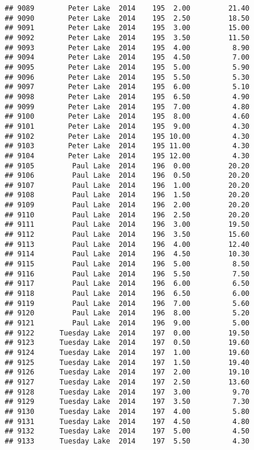 \documentclass[
]{article}
\begin{document}
\begin{verbatim}
## 9089        Peter Lake  2014    195  2.00         21.40
## 9090        Peter Lake  2014    195  2.50         18.50
## 9091        Peter Lake  2014    195  3.00         15.00
## 9092        Peter Lake  2014    195  3.50         11.50
## 9093        Peter Lake  2014    195  4.00          8.90
## 9094        Peter Lake  2014    195  4.50          7.00
## 9095        Peter Lake  2014    195  5.00          5.90
## 9096        Peter Lake  2014    195  5.50          5.30
## 9097        Peter Lake  2014    195  6.00          5.10
## 9098        Peter Lake  2014    195  6.50          4.90
## 9099        Peter Lake  2014    195  7.00          4.80
## 9100        Peter Lake  2014    195  8.00          4.60
## 9101        Peter Lake  2014    195  9.00          4.30
## 9102        Peter Lake  2014    195 10.00          4.30
## 9103        Peter Lake  2014    195 11.00          4.30
## 9104        Peter Lake  2014    195 12.00          4.30
## 9105         Paul Lake  2014    196  0.00         20.20
## 9106         Paul Lake  2014    196  0.50         20.20
## 9107         Paul Lake  2014    196  1.00         20.20
## 9108         Paul Lake  2014    196  1.50         20.20
## 9109         Paul Lake  2014    196  2.00         20.20
## 9110         Paul Lake  2014    196  2.50         20.20
## 9111         Paul Lake  2014    196  3.00         19.50
## 9112         Paul Lake  2014    196  3.50         15.60
## 9113         Paul Lake  2014    196  4.00         12.40
## 9114         Paul Lake  2014    196  4.50         10.30
## 9115         Paul Lake  2014    196  5.00          8.50
## 9116         Paul Lake  2014    196  5.50          7.50
## 9117         Paul Lake  2014    196  6.00          6.50
## 9118         Paul Lake  2014    196  6.50          6.00
## 9119         Paul Lake  2014    196  7.00          5.60
## 9120         Paul Lake  2014    196  8.00          5.20
## 9121         Paul Lake  2014    196  9.00          5.00
## 9122      Tuesday Lake  2014    197  0.00         19.50
## 9123      Tuesday Lake  2014    197  0.50         19.60
## 9124      Tuesday Lake  2014    197  1.00         19.60
## 9125      Tuesday Lake  2014    197  1.50         19.40
## 9126      Tuesday Lake  2014    197  2.00         19.10
## 9127      Tuesday Lake  2014    197  2.50         13.60
## 9128      Tuesday Lake  2014    197  3.00          9.70
## 9129      Tuesday Lake  2014    197  3.50          7.30
## 9130      Tuesday Lake  2014    197  4.00          5.80
## 9131      Tuesday Lake  2014    197  4.50          4.80
## 9132      Tuesday Lake  2014    197  5.00          4.50
## 9133      Tuesday Lake  2014    197  5.50          4.30

\end{verbatim}
\end{document}
